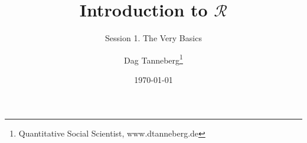 \usepackage[utf8]{inputenc}
\usepackage{hyperref}
\usepackage{graphicx}
\usepackage{booktabs}
\usepackage{multirow}

\title{Introduction to $\mathcal{R}$}
\subtitle{Session 1. The Very Basics}
\author{Dag Tanneberg\thanks{%
    Quantitative Social Scientist, www.dtanneberg.de
  }
}
\date{\today}
\hypersetup{colorlinks, urlcolor = red, linkcolor = }
